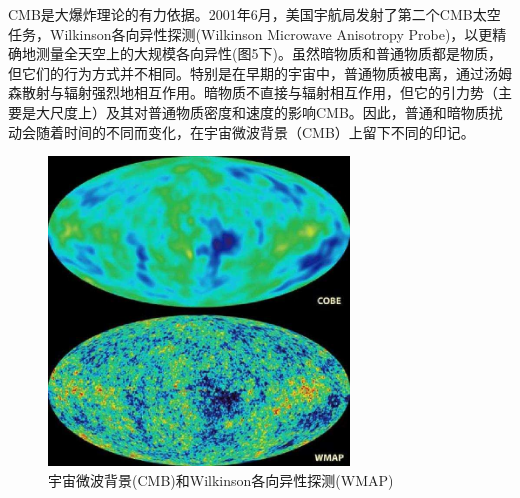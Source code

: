 \documentclass[UTF8]{ctexart}
\begin{document}
CMB是大爆炸理论的有力依据。2001年6月，美国宇航局发射了第二个CMB太空任务，Wilkinson各向异性探测(Wilkinson Microwave Anisotropy Probe)，以更精确地测量全天空上的大规模各向异性(图5下)。虽然暗物质和普通物质都是物质，但它们的行为方式并不相同。特别是在早期的宇宙中，普通物质被电离，通过汤姆森散射与辐射强烈地相互作用。暗物质不直接与辐射相互作用，但它的引力势（主要是大尺度上）及其对普通物质密度和速度的影响CMB。因此，普通和暗物质扰动会随着时间的不同而变化，在宇宙微波背景（CMB）上留下不同的印记。
\begin{figure}[H]
    \centering
    \includegraphics[width=8cm]{cmb.png}
    \caption{宇宙微波背景(CMB)和Wilkinson各向异性探测(WMAP)}
    \label{fig:my_label}
\end{figure}
\end{document}
